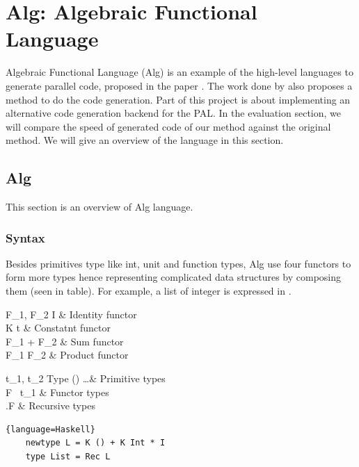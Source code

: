 \chapter{Alg: Algebraic Functional Language}
Algebraic Functional Language (Alg) is an example of the high-level languages to generate parallel code, proposed in the paper \cite{AlgebraicMultipartyProtocol}. The work done by \cite{AlgebraicMultipartyProtocol} also proposes a method to do the code generation. Part of this project is about implementing an alternative code generation backend for the PAL. In the evaluation section, we will compare the speed of generated code of our method against the original method. We will give an overview of the language in this section.  
\section{Alg}
This section is an overview of Alg language. 
\subsection{Syntax}
Besides primitives type like int, unit and function types, Alg use four functors to form more types hence representing complicated data structures by composing them (seen in table). For example, a list of integer is expressed in .
\begin{table}[ht]
\begin{grammar}{F_1, F_2 \Coloneqq}{}
    I & Identity functor\\
    K t & Constatnt functor\\
    F_1 + F_2 & Sum functor\\
    F_1 \times F_2 & Product functor
\end{grammar}
\hfill
\begin{grammar}{t_1, t_2 \Coloneqq}{Type}
    () \mid {} \mid \dots & Primitive types\\
    F \ t_1 & Functor types\\
    \mu .F & Recursive types\\
\end{grammar}
\caption{Functor and Type definitions}
\end{table}
\begin{code}
\begin{lstlisting}{language=Haskell}
    newtype L = K () + K Int * I
    type List = Rec L
\end{lstlisting}
\caption{Type of integer list in PAL}
\label{p:pal:c1}
\end{code}

